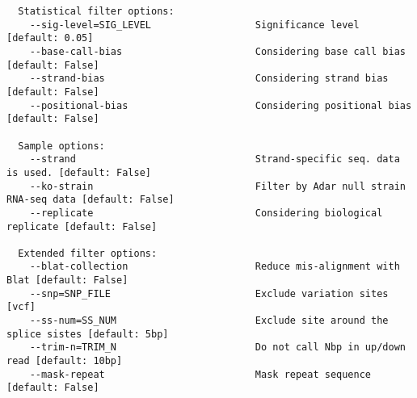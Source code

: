\begin{verbatim}
  Statistical filter options:
    --sig-level=SIG_LEVEL                  Significance level [default: 0.05]
    --base-call-bias                       Considering base call bias [default: False]
    --strand-bias                          Considering strand bias [default: False]
    --positional-bias                      Considering positional bias [default: False]

  Sample options:
    --strand                               Strand-specific seq. data is used. [default: False]
    --ko-strain                            Filter by Adar null strain RNA-seq data [default: False]
    --replicate                            Considering biological replicate [default: False]

  Extended filter options:
    --blat-collection                      Reduce mis-alignment with Blat [default: False]
    --snp=SNP_FILE                         Exclude variation sites [vcf]
    --ss-num=SS_NUM                        Exclude site around the splice sistes [default: 5bp]
    --trim-n=TRIM_N                        Do not call Nbp in up/down read [default: 10bp]
    --mask-repeat                          Mask repeat sequence [default: False]
  \end{verbatim}
\normalsize  